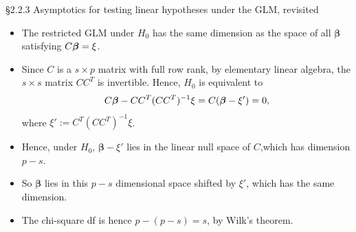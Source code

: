 \documentclass{beamer}
\newcommand{\boldbeta}{{\boldsymbol \beta}}
\begin{document}
\begin{frame}{\S2.2.3  Asymptotics for testing linear hypotheses under the GLM, revisited }

\begin{itemize}


\item The restricted GLM under $H_0$ has the same dimension as the space of all $\boldbeta$ satisfying $C{\boldmath \boldbeta}={\boldmath \xi}$.

\item Since $C$ is a $s \times p$ matrix with full row rank, by elementary linear algebra,  the $s \times s$ matrix $C C^T$ is invertible. Hence, $H_0$ is  equivalent to
\[
C{\boldmath \boldbeta} -  C C^T (C C^T)^{-1} \xi = C (\boldbeta - \xi') = 0,
\]
where $\xi' := C^T (C C^T)^{-1} \xi$.

\item Hence, under $H_0$, $\boldbeta - \xi'$ lies in the linear null space of $C$,which has dimension $p-s$.

\item So $\boldbeta$ lies in this $p-s$ dimensional space shifted by $\xi'$, which has the same dimension.


\item The chi-square df is hence $p - (p -s) = s$, by Wilk's theorem.
\end{itemize}


\end{frame}
\end{document}
